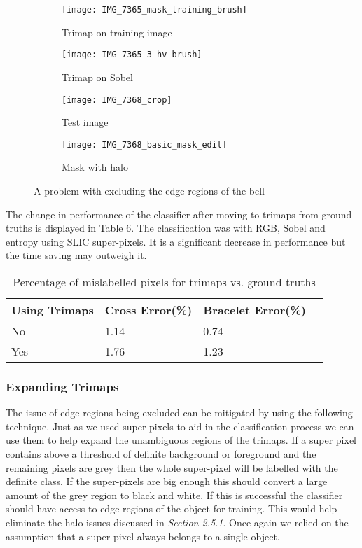\documentclass[12pt]{IIBproject}
\begin{document}
\begin{figure}[H]
\centering
\begin{subfigure}{.45\textwidth}
  \centering
  \texttt{[image: IMG\_7365\_mask\_training\_brush]}
  \caption{Trimap on training image}
  \label{fig:sub1}
\end{subfigure}%
\begin{subfigure}{.45\textwidth}
  \centering
  \texttt{[image: IMG\_7365\_3\_hv\_brush]}
  \caption{Trimap on Sobel}
  \label{fig:sub2}
\end{subfigure}
\begin{subfigure}{.45\textwidth}
  \centering
  \texttt{[image: IMG\_7368\_crop]}
  \caption{Test image}
  \label{fig:sub2}
\end{subfigure}
\begin{subfigure}{.45\textwidth}
  \centering
  \texttt{[image: IMG\_7368\_basic\_mask\_edit]}
  \caption{Mask with halo}
  \label{fig:sub2}
\end{subfigure}
\caption{A problem with excluding the edge regions of the bell}
\label{fig:test}
\end{figure}
The change in performance of the classifier after moving to trimaps from ground truths is displayed in Table 6. The classification was with RGB, Sobel and entropy using SLIC super-pixels. It is a significant decrease in performance but the time saving may outweigh it.
\begin{table}
\begin{center}
    \begin{tabular}{ | l | l | l | p{5cm} |}
    \hline
    Using Trimaps & Cross Error(\%) & Bracelet Error(\%) \\ \hline
    No & 1.14 & 0.74 \\ \hline
    Yes & 1.76 & 1.23 \\
    \hline
    
    \end{tabular}
    \caption{Percentage of mislabelled pixels for trimaps vs. ground truths}\label{table:somename}
\end{center}
\end{table}




\subsubsection{Expanding Trimaps}
The issue of edge regions being excluded can be mitigated by using the following technique. Just as we used super-pixels to aid in the classification process we can use them to help expand the unambiguous regions of the trimaps. If a super pixel contains above a threshold of definite background or foreground and the remaining pixels are grey then the whole super-pixel will be labelled with the definite class. If the super-pixels are big enough this should convert a large amount of the grey region to black and white. If this is successful the classifier should have access to edge regions of the object for training. This would help eliminate the halo issues discussed in \emph{Section 2.5.1}. Once again we relied on the assumption that a super-pixel always belongs to a single object.  
\end{document}
